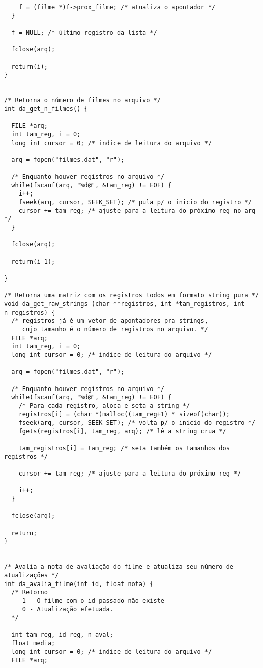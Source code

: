 \documentclass[11pt,twoside]{article}
\begin{document}
\begin{verbatim}
    f = (filme *)f->prox_filme; /* atualiza o apontador */
  }

  f = NULL; /* último registro da lista */
  
  fclose(arq);
  
  return(i);
}


/* Retorna o número de filmes no arquivo */
int da_get_n_filmes() {

  FILE *arq;
  int tam_reg, i = 0;
  long int cursor = 0; /* indice de leitura do arquivo */

  arq = fopen("filmes.dat", "r");

  /* Enquanto houver registros no arquivo */
  while(fscanf(arq, "%d@", &tam_reg) != EOF) {
    i++;
    fseek(arq, cursor, SEEK_SET); /* pula p/ o inicio do registro */
    cursor += tam_reg; /* ajuste para a leitura do próximo reg no arq */
  }
  
  fclose(arq);
  
  return(i-1);
	
}

/* Retorna uma matriz com os registros todos em formato string pura */
void da_get_raw_strings (char **registros, int *tam_registros, int n_registros) {
  /* registros já é um vetor de apontadores pra strings, 
     cujo tamanho é o número de registros no arquivo. */
  FILE *arq;
  int tam_reg, i = 0;
  long int cursor = 0; /* indice de leitura do arquivo */

  arq = fopen("filmes.dat", "r");

  /* Enquanto houver registros no arquivo */
  while(fscanf(arq, "%d@", &tam_reg) != EOF) {
    /* Para cada registro, aloca e seta a string */
    registros[i] = (char *)malloc((tam_reg+1) * sizeof(char));
    fseek(arq, cursor, SEEK_SET); /* volta p/ o inicio do registro */
    fgets(registros[i], tam_reg, arq); /* lê a string crua */

    tam_registros[i] = tam_reg; /* seta também os tamanhos dos registros */

    cursor += tam_reg; /* ajuste para a leitura do próximo reg */
		
    i++;
  }
  
  fclose(arq);
  
  return;
}


/* Avalia a nota de avaliação do filme e atualiza seu número de atualizações */
int da_avalia_filme(int id, float nota) {
  /* Retorno
     1 - O filme com o id passado não existe
     0 - Atualização efetuada.
  */

  int tam_reg, id_reg, n_aval;
  float media;
  long int cursor = 0; /* indice de leitura do arquivo */
  FILE *arq;


\end{verbatim}
\end{document}

